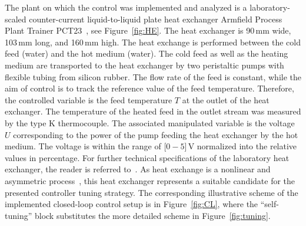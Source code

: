 \documentclass[preprint,12pt]{elsarticle}
\begin{document}
	The plant on which the control was implemented and analyzed is a laboratory-scaled counter-current liquid-to-liquid plate heat exchanger Armfield Process Plant Trainer PCT23~\cite{pct23}, see Figure~\ref{fig:HE}. The heat exchanger is 90\,mm wide, 103\,mm long, and 160\,mm high. The heat exchange is performed between the cold feed (water) and the hot medium (water). The cold feed as well as the heating medium are transported to the heat exchanger by two peristaltic pumps with flexible tubing from silicon rubber. The flow rate of the feed is constant, while the aim of control is to track the reference value of the feed temperature. Therefore, the controlled variable is the feed temperature $T$ at the outlet of the heat exchanger. The temperature of the heated feed in the outlet stream was measured by the type K thermocouple. The associated manipulated variable is the voltage $U$ corresponding to the power of the pump feeding the heat exchanger by the hot medium. The voltage is within the range of [$0-5$]\,V normalized into the relative values in percentage. For further technical specifications of the laboratory heat exchanger, the reader is referred to~\cite{pct23}. As heat exchange is a nonlinear and asymmetric process~\cite{Liptak}, this heat exchanger represents a suitable candidate for the presented controller tuning strategy. The corresponding illustrative scheme of the implemented closed-loop control setup is in Figure~\ref{fig:CL}, where the ``self-tuning'' block substitutes the more detailed scheme in Figure~\ref{fig:tuning}.  
	
\end{document}
